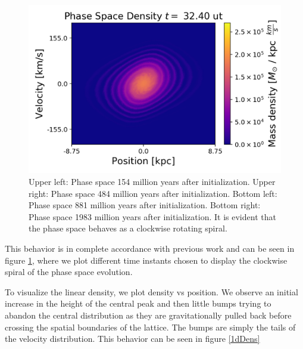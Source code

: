 \begin{figure}[h!]
    \includegraphics[scale=0.45]{imag/gauss81.png}
    \caption{Upper left: Phase space 154 million years after initialization. Upper right: Phase space 484 million years after initialization. Bottom left: Phase space 881 million years after initialization. Bottom right: Phase space 1983 million years after initialization. It is evident that the phase space behaves as a clockwise rotating spiral.}
    \label{1dphase}
\end{figure}


This behavior is in complete accordance with previous work and can be seen in figure \ref{1dphase}, where we plot different time instants chosen to display the clockwise spiral of the phase space evolution.

To visualize the linear density, we plot density vs position. We observe an initial increase in the height of the central peak and then little bumps trying to abandon the central distribution as they are gravitationally pulled back before crossing the spatial boundaries of the lattice. The bumps are simply the tails of the velocity distribution. This behavior can be seen in figure \ref{1dDens}




